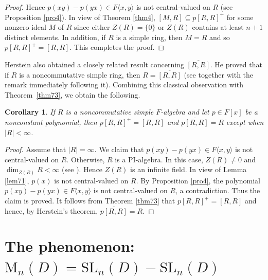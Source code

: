 \documentclass[11pt]{article}
\newtheorem{corollary}[theorem]{Corollary}
\theoremstyle{definition}
\begin{document}
{{{{\begin{proof}
Hence $p(xy)-p(yx)\in F\langle x, y \rangle$ is not central-valued on $R$ (see Proposition \ref{pro4}).
In view of Theorem \ref{thm4}, $[M, R]\subseteq p[R,R]^+$ for some nonzero ideal $M$ of $R$ since either $Z(R)=\{0\}$ or $Z(R)$ contains at least $n+1$ distinct elements. In addition, if $R$ is a simple ring, then $M=R$ and so
					$p[R,R]^+=[R, R]$. This completes the proof.
				\end{proof}				
				
				Herstein also obtained a closely related result concerning $\overline{[R,R]}$. He proved that if $R$ is a noncommutative simple ring, then $R=\overline{[R,R]}$ (see \cite[Corollary, p.~6]{Bo_Her_69} together with the remark immediately following it).  Combining this classical observation with Theorem~\ref{thm73}, we obtain the following.
				
				\begin{corollary}\label{cor23}
					If $R$ is a noncommutative simple $F$-algebra and  let $p \in F[x]$ be a nonconstant
					polynomial, then $p[R,R]^+=[R, R]$  and ${\overline {p[R,R]}}=R$ except when $|R|<\infty$.
				\end{corollary}
				
				\begin{proof}
					Assume that $|R|=\infty$. We claim that $p(xy)-p(yx)\in F\langle x, y \rangle$ is not central-valued on $R$.
					Otherwise, $R$ is a PI-algebra. In this case, $Z(R)\ne 0$ and $\dim_{Z(R)}R<\infty$ (see \cite[Theorem 2 and Corollary 1]{rowen1973}). Hence $Z(R)$ is an infinite field. In view of Lemma \ref{lem71}, $p(x)$  is not central-valued on $R$.
 By Proposition \ref{pro4}, the polynomial $p(xy)-p(yx)\in F\langle x, y \rangle$ is not central-valued on $R$, a contradiction.	Thus the claim is proved.
It follows from Theorem \ref{thm73} that $p[R,R]^+=[R, R]$ and hence, by Herstein's theorem,  ${\overline {p[R,R]}}=R$.
				\end{proof}
				
			
				
				\section{The phenomenon: $\mathrm{M}_n(D)=\mathrm{SL}_n(D)-\mathrm{SL}_n(D)$}\label{sec phe}
				
}}}}
\end{document}
